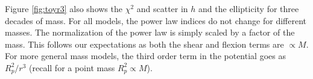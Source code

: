 Figure \ref{fig:toyr3} also shows the $\chi^2$ and scatter in $h$ and the ellipticity for three decades of mass. For all models, the power law indices do not change for different masses. The normalization of the power law is simply scaled by a factor of the mass. This follows our expectations as both the shear and flexion terms are $\propto M$. For more general mass models, the third order term in the potential goes as $R_p^2/r^3$ (recall for a point mass $R_p^2 \propto M$).